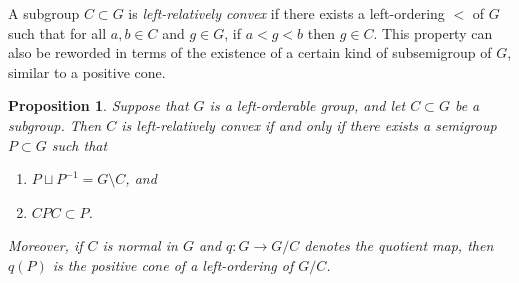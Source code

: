 \documentclass{amsart}
\newtheorem{proposition}[theorem]{Proposition}
\theoremstyle{definition}
\theoremstyle{remark}
\begin{document}
A subgroup $C \subset G$ is \emph{left-relatively convex} if there exists a left-ordering $<$ of $G$ such that for all $a, b \in C$ and $g \in G$, if $a<g<b$ then $g \in C$.  This property can also be reworded in terms of the existence of a certain kind of subsemigroup of $G$, similar to a positive cone.

\begin{proposition}
\label{prop : rel cone}
    Suppose that $G$ is a left-orderable group, and let $C \subset G$ be a subgroup.  Then $C$ is left-relatively convex if and only if there exists a semigroup $P \subset G$ such that 
    \begin{enumerate}
        \item $P \sqcup P^{-1} = G \setminus C$, and
        \item $CPC \subset P$.
    \end{enumerate}
    Moreover, if $C$ is normal in $G$ and $q\colon G \rightarrow G/C$ denotes the quotient map, then $q(P)$ is the positive cone of a left-ordering of $G/C$.
\end{proposition}
\end{document}

